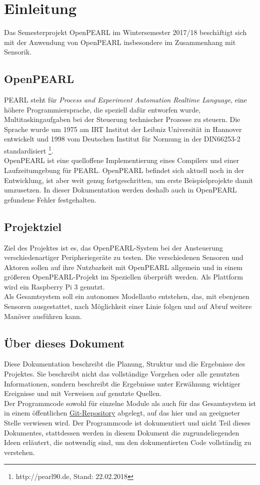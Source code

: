 \chapter{Einleitung}

	Das Semesterprojekt OpenPEARL im Wintersemester 2017/18 beschäftigt sich mit der Anwendung von OpenPEARL insbesondere im Zusammenhang mit Sensorik. 
	
	\section{OpenPEARL}
	PEARL steht für \emph{Process and Experiment Automation Realtime Language}, eine höhere Programmiersprache, die speziell dafür entworfen wurde, Multitaskingaufgaben bei der Steuerung technischer Prozesse zu steuern. Die Sprache wurde um 1975 am IRT Institut der Leibniz Universität in Hannover entwickelt und 1998 vom Deutschen Institut für Normung in der DIN66253-2 standardisiert \footnote{http://pearl90.de, Stand: 22.02.2018}.\\
	OpenPEARL ist eine quelloffene Implementierung eines Compilers und einer Laufzeitumgebung für PEARL. OpenPEARL befindet sich aktuell noch in der Entwicklung, ist aber weit genug fortgeschritten, um erste Beispielprojekte damit umzusetzen. In dieser Dokumentation werden deshalb auch in OpenPEARL gefundene Fehler festgehalten.
	
	\section{Projektziel}
	Ziel des Projektes ist es, das OpenPEARL-System bei der Ansteuerung verschiedenartiger Peripheriegeräte zu testen. Die verschiedenen Sensoren und Aktoren sollen auf ihre Nutzbarkeit mit OpenPEARL allgemein und in einem größeren OpenPEARL-Projekt im Speziellen überprüft werden. Als Plattform wird ein Raspberry Pi 3 genutzt. \\
	Als Gesamtsystem soll ein autonomes Modellauto entstehen, das, mit ebenjenen Sensoren ausgestattet, nach Möglichkeit einer Linie folgen und auf Abruf weitere Manöver ausführen kann.
	
	\section{Über dieses Dokument}
	Diese Dokumentation beschreibt die Planung, Struktur und die Ergebnisse des Projektes. Sie beschreibt nicht das vollständige Vorgehen oder alle genutzten Informationen, sondern beschreibt die Ergebnisse unter Erwähnung wichtiger Ereignisse und mit Verweisen auf genutzte Quellen. \\
	Der Programmcode sowohl für einzelne Module als auch für das Gesamtsystem ist in einem öffentlichen \href{https://github.com/OpenPearl-HFUWPV1718/SensorCar}{Git-Repository} abgelegt, auf das hier und an geeigneter Stelle verwiesen wird. Der Programmcode ist dokumentiert und nicht Teil dieses Dokumentes, stattdessen werden in diesem Dokument die zugrundeliegenden Ideen erläutert, die notwendig sind, um den dokumentierten Code vollständig zu verstehen.
	
	
	